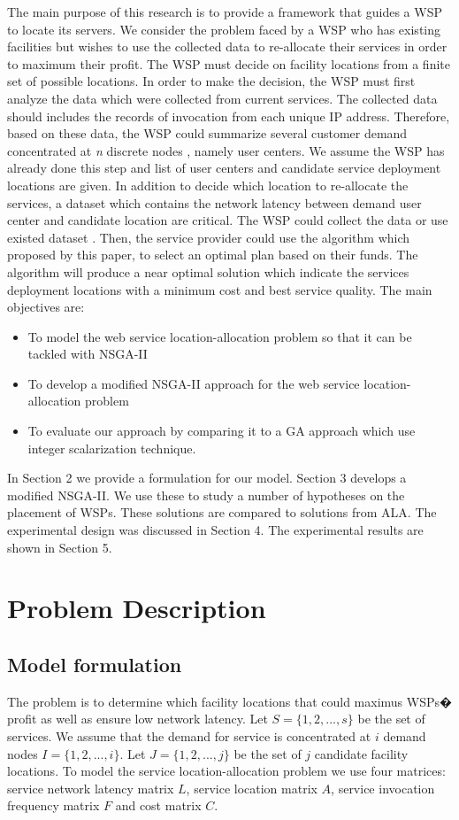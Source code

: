 \documentclass{llncs}
\begin{document}
The main purpose of this research is to provide a framework that guides a WSP to locate its servers.
We consider the problem faced by a WSP who has existing facilities but wishes to use the collected data to re-allocate their services in order to maximum their profit.
The WSP must decide on facility locations from a finite set of possible locations. 
In order to make the decision, the WSP must first analyze the data which were collected from current services. 
The collected data should includes the records of invocation from each unique IP address.
Therefore, based on these data, the WSP could summarize several customer demand concentrated at \textit{n} discrete nodes \cite{Aboolian}, namely user centers. 
We assume the WSP has already done this step and list of user centers and candidate service deployment locations are given.
In addition to decide which location to re-allocate the services, a dataset which contains the network latency between demand user center and candidate location are critical. 
The WSP could collect the data or use existed dataset \cite{5552800} \cite{6076756}. 
Then, the service provider could use the algorithm which proposed by this paper, to select an optimal plan based on their funds. 
The algorithm will produce a near optimal solution which indicate the services deployment locations with a minimum cost and best service quality.
The main objectives are:
\begin{itemize}
	\item To model the web service location-allocation problem so that it can be tackled with NSGA-II
	\item To develop a modified NSGA-II approach for the web service location-allocation problem
	\item To evaluate our approach by comparing it to a GA approach which use integer scalarization technique.
\end{itemize}


In Section 2 we provide a formulation for our model. Section 3 develops a modified NSGA-II. 
We use these to study a number of hypotheses on the placement of WSPs. These solutions are compared to solutions from ALA. 
The experimental design was discussed in Section 4. The experimental results are shown in Section 5.



\section{Problem Description}
\subsection{Model formulation}
The problem is to determine which facility locations that could maximus WSPs� profit 
as well as ensure low network latency. 
Let $S = \{ 1, 2, ..., s\}$ be the set of services. We assume that the demand for service is concentrated at $i$ 
demand nodes $I = \{ 1, 2, ..., i \}$. Let $J = \{ 1, 2, ..., j \}$ be the set of $j$ candidate facility locations.
To model the service location-allocation problem we use four matrices: service network latency matrix $L$, service location
matrix $A$, service invocation frequency matrix $F$ and cost matrix $C$.
\end{document}
